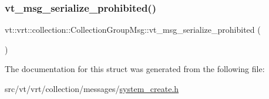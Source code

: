 \mbox{\label{structvt_1_1vrt_1_1collection_1_1_collection_group_msg_ae4d92c74c6899563aada25b9d5ffad06}} 
\subsubsection{\texorpdfstring{vt\+\_\+msg\+\_\+serialize\+\_\+prohibited()}{vt\_msg\_serialize\_prohibited()}}
{\footnotesize\ttfamily vt\+::vrt\+::collection\+::\+Collection\+Group\+Msg\+::vt\+\_\+msg\+\_\+serialize\+\_\+prohibited (\begin{DoxyParamCaption}{ }\end{DoxyParamCaption})}



The documentation for this struct was generated from the following file\+:\begin{DoxyCompactItemize}
\item 
src/vt/vrt/collection/messages/\hyperlink{system__create_8h}{system\+\_\+create.\+h}\end{DoxyCompactItemize}
